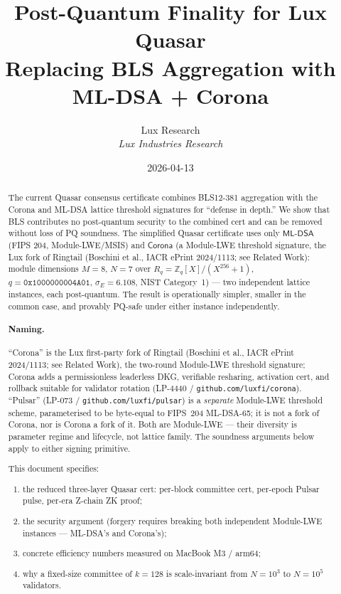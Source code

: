\documentclass[11pt]{article}
\title{Post-Quantum Finality for Lux Quasar \\ {\large Replacing BLS Aggregation with ML-DSA + Corona}}
\author{Lux Research \\
\textit{Lux Industries Research}}
\date{2026-04-13}
\begin{document}
\maketitle

\begin{abstract}
The current Quasar consensus certificate combines BLS12-381 aggregation with
the Corona and ML-DSA lattice threshold signatures for ``defense in
depth.'' We show
that BLS contributes no post-quantum security to the combined cert and
can be removed without loss of PQ soundness. The simplified Quasar
certificate uses only $\mathsf{ML\text{-}DSA}$ (FIPS 204, Module-LWE/MSIS)
and $\mathsf{Corona}$ (a Module-LWE threshold signature, the Lux fork of
Ringtail (Boschini et al., IACR ePrint 2024/1113; see Related Work):
module dimensions $M=8$, $N=7$ over
$R_q = \mathbb{Z}_q[X]/(X^{256}+1)$, $q = \mathtt{0x1000000004A01}$,
$\sigma_E = 6.108$, NIST Category~1) --- two independent
lattice instances, each post-quantum. The result is operationally simpler,
smaller in the common case, and provably PQ-safe under either instance
independently.

\paragraph{Naming.} ``Corona'' is the Lux first-party fork of Ringtail
(Boschini et al., IACR ePrint 2024/1113; see Related Work), the
two-round Module-LWE threshold signature;
Corona adds a permissionless leaderless DKG, verifiable resharing,
activation cert, and rollback suitable for validator rotation (LP-4440 /
\texttt{github.com/luxfi/corona}). ``Pulsar'' (LP-073 /
\texttt{github.com/luxfi/pulsar}) is a \emph{separate} Module-LWE
threshold scheme, parameterised to be byte-equal to FIPS~204 ML-DSA-65;
it is not a fork of Corona, nor is Corona a fork of it. Both are
Module-LWE --- their diversity is parameter regime and lifecycle, not
lattice family. The soundness arguments below apply to either signing
primitive.

This document specifies:
\begin{enumerate}
  \item the reduced three-layer Quasar cert: per-block committee cert,
        per-epoch Pulsar pulse, per-era Z-chain ZK proof;
  \item the security argument (forgery requires breaking both
        independent Module-LWE instances --- ML-DSA's and Corona's);
  \item concrete efficiency numbers measured on MacBook M3 / arm64;
  \item why a fixed-size committee of $k=128$ is scale-invariant from
        $N=10^3$ to $N=10^5$ validators.
\end{enumerate}
\end{abstract}
\end{document}
